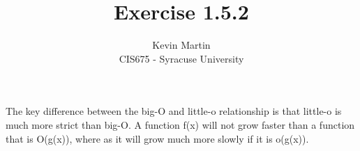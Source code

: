 \documentclass{article}
\author{Kevin Martin\\ CIS675 - Syracuse University}
\title{Exercise 1.5.2}
\begin{document}
\maketitle
The key difference between the big-O and little-o relationship is that little-o is much more strict than big-O. 
A function f(x) will not grow faster than a function that is O(g(x)), where as it will grow much more slowly
if it is o(g(x)).
\end{document}
